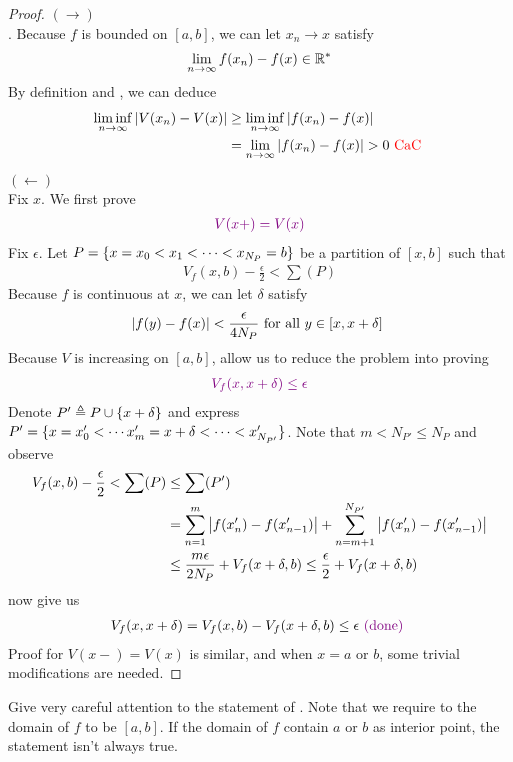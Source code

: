 \documentclass{report}
\begin{document}
\begin{proof}
$(\longrightarrow)$\\

. Because $f$ is bounded on  $[a,b]$, we can let $x_n \to x$ satisfy 
\begin{align*}
  \lim_{n\to \infty} f(x_n)-f(x)\in\mathbb{R}^*
\end{align*}
By definition and , we can deduce  
\begin{align*}
  \liminf_{n\to\infty} \abso{V(x_n)-V(x)}&\geq \liminf_{n\to\infty} \abso{f(x_n)-f(x)} \\
  &=\lim_{n\to \infty} \abso{f(x_n)-f(x)}>0 \tCaC
\end{align*}

$(\longleftarrow)$\\

Fix $x$. We first prove 
\begin{align*}
\textcolor{violet}{V(x+)=V(x)}
\end{align*}
Fix $\epsilon $. Let $P=\{ x=x_0<x_1 <\cdots < x_{N_P}=b \}$ be a partition of $[x,b]$ such that 
\begin{align*}
V_f(x,b) - \frac{\epsilon}{2} < \sum (P) 
\end{align*}
Because $f$ is continuous at $x$, we can let $\delta$ satisfy 
\begin{align*}
  \left|f(y)-f(x)\right|< \frac{\epsilon}{4N_P}\text{ for all $y \in [x,x+\delta]$ }
\end{align*}
Because $V$ is increasing on  $[a,b]$,  allow us to reduce the problem into proving 
\begin{align*}
  \textcolor{violet}{V_f(x,x+\delta)\leq \epsilon }
\end{align*}
Denote $P'\triangleq  P\cup \{ x+\delta \}$ and express  $P'=\{ x=x_0' < \cdots x'_m =x+\delta < \cdots < x_{N_{P'}}'  \}$. Note that $m<N_{P'}\leq N_P$ and observe
\begin{align*}
  V_f(x,b)- \frac{\epsilon}{2}< \sum (P)&\leq \sum (P')\\
&= \sum_{n=1}^{m} \left|f(x'_n)-f(x'_{n-1})\right| + \sum_{n=m+1}^{N_{P'}} \left|f(x'_n)-f(x'_{n-1})\right|\\
&\leq \frac{m\epsilon }{2N_P}  + V_f(x+\delta,b)\leq \frac{\epsilon }{2}+ V_f(x+\delta ,b)
\end{align*}
 now give us 
\begin{align*}
V_f(x,x+\delta)=V_f(x,b)-V_f(x+\delta,b)\leq \epsilon  \textcolor{violet}{\text{ (done) }}
\end{align*}
Proof for $V(x-)=V(x)$ is similar, and when $x=a\text{ or }b$, some trivial modifications are needed.
\end{proof}
\begin{mdframed}
Give very careful attention to the statement of . Note that we require to the domain of $f$ to be $[a,b]$. If the domain of $f$ contain  $a\text{ or }b$ as interior point, the statement isn't always true. 
\end{mdframed}
\end{document}

